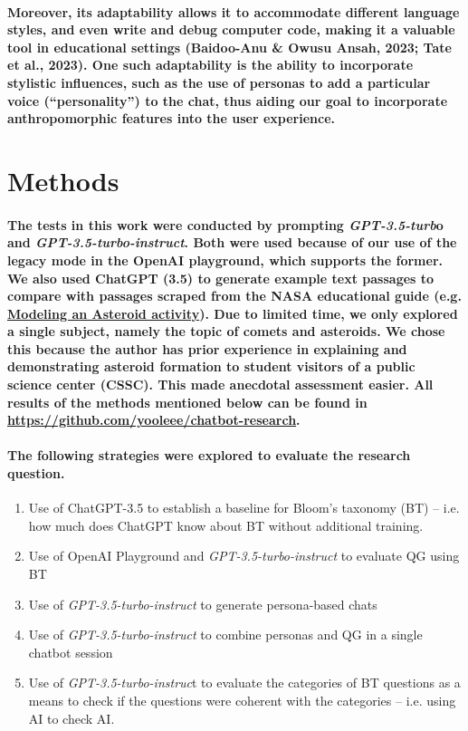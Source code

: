 \documentclass{article}
\begin{document}
\paragraph{Moreover, its adaptability allows it to accommodate different language styles, and even write and debug computer code, making it a valuable tool in educational settings (Baidoo-Anu \& Owusu Ansah, 2023; Tate et al., 2023). One such adaptability is the ability to incorporate stylistic influences, such as the use of personas to add a particular voice (“personality”) to the chat, thus aiding our goal to incorporate anthropomorphic features into the user experience.}

\section*{Methods}

\paragraph{The tests in this work were conducted by prompting \textit{GPT-3.5-turb}o and \textit{GPT-3.5-turbo-instruct}. Both were used because of our use of the legacy mode in the OpenAI playground, which supports the former. We also used ChatGPT (3.5) to generate example text passages to compare with passages scraped from the NASA educational guide (e.g. \href{https://www.jpl.nasa.gov/edu/teach/activity/modeling-an-asteroid/}{Modeling an Asteroid activity}). Due to limited time, we only explored a single subject, namely the topic of comets and asteroids. We chose this because the author has prior experience in explaining and demonstrating asteroid formation to student visitors of a public science center (CSSC). This made anecdotal assessment easier. All results of the methods mentioned below can be found in \href{https://github.com/yooleee/chatbot-research}{https://github.com/yooleee/chatbot-research}.}

\paragraph{The following strategies were explored to evaluate the research question.}

\begin{enumerate}
    \item Use of ChatGPT-3.5 to establish a baseline for Bloom’s taxonomy (BT) – i.e. how much does ChatGPT know about BT without additional training.
    \item Use of OpenAI Playground and \textit{GPT-3.5-turbo-instruct} to evaluate QG using BT
    \item Use of \textit{GPT-3.5-turbo-instruct} to generate persona-based chats
    \item Use of \textit{GPT-3.5-turbo-instruct} to combine personas and QG in a single chatbot session
    \item Use of \textit{GPT-3.5-turbo-instruc}t to evaluate the categories of BT questions as a means to check if the questions were coherent with the categories – i.e. using AI to check AI.
\end{enumerate}
\end{document}
